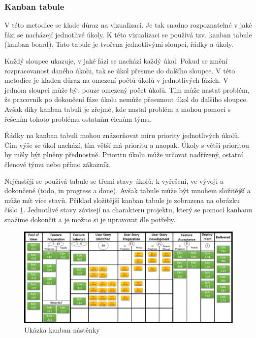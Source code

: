 \documentclass[czech,DP]{thesiskiv}
\begin{document}
\subsubsection{Kanban tabule}
V této metodice se klade důraz na vizualizaci. Je tak snadno rozpoznatelné v jaké fázi se nacházejí jednotlivé úkoly. K této vizualizaci se používá tzv. kanban tabule (kanban board). Tato tabule je tvořena jednotlivými sloupci, řádky a úkoly. 
\par
Každý sloupec ukazuje, v jaké fázi se nachází každý úkol. Pokud se změní rozpracovanost daného úkolu, tak se úkol přesune do dalšího sloupce. V této metodice je kladen důraz na omezení počtů úkolů v jednotlivých fázích. V jednom sloupci může být pouze omezený počet úkolů. Tím může nastat problém, že pracovník po dokončení fáze úkolu nemůže přesunout úkol do dalšího sloupce. Avšak díky kanban tabuli je zřejmé, kde nastal problém a mohou pomoci s řešením tohoto problému ostatním členům týmu. 
\par
Řádky na kanban tabuli mohou znázorňovat míru priority jednotlivých úkolů. Čím výše se úkol nachází, tím větší má prioritu a naopak. Úkoly s větší prioritou by měly být plněny přednostně. Prioritu úkolu může určovat nadřízený, ostatní členové týmu nebo přímo zákazník.
\par
Nejčastěji se používá tabule se třemi stavy úkolů: k vyřešení, ve vývoji a dokončené (todo, in progress a done). Avšak tabule může být mnohem složitější a může mít více stavů. Příklad složitější kanban tabule je zobrazena na obrázku číslo \ref{img:kanban_board}. Jednotlivé stavy závisejí na charakteru projektu, který se pomocí kanbanu snažíme dokončit a je možno si je upravovat dle potřeby.
\begin{figure}[!htb]
    \centering
    \includegraphics[width=\textwidth]{img/kanban.png}
    \caption{Ukázka kanban nástěnky \cite{metodiky}}
    \label{img:kanban_board}
\end{figure}
\FloatBarrier
\end{document}

